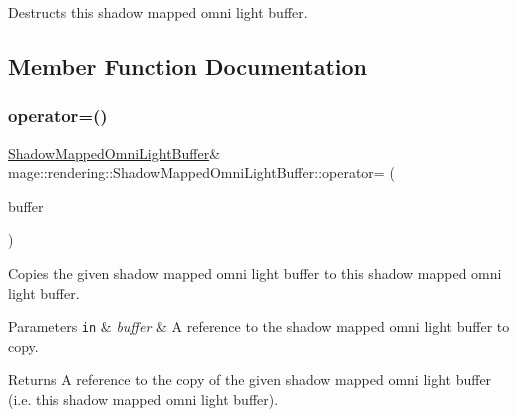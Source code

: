 Destructs this shadow mapped omni light buffer. 

\subsection{Member Function Documentation}
\hypertarget{structmage_1_1rendering_1_1_shadow_mapped_omni_light_buffer_ae43119f667592aea06f73532a9c9b742}{}\label{structmage_1_1rendering_1_1_shadow_mapped_omni_light_buffer_ae43119f667592aea06f73532a9c9b742} 
\subsubsection{\texorpdfstring{operator=()}{operator=()}\hspace{0.1cm}{\footnotesize\ttfamily [1/2]}}
{\footnotesize\ttfamily \hyperlink{structmage_1_1rendering_1_1_shadow_mapped_omni_light_buffer}{Shadow\+Mapped\+Omni\+Light\+Buffer}\& mage\+::rendering\+::\+Shadow\+Mapped\+Omni\+Light\+Buffer\+::operator= (\begin{DoxyParamCaption}\item[{const \hyperlink{structmage_1_1rendering_1_1_shadow_mapped_omni_light_buffer}{Shadow\+Mapped\+Omni\+Light\+Buffer} \&}]{buffer }\end{DoxyParamCaption})\hspace{0.3cm}{\ttfamily [default]}}

Copies the given shadow mapped omni light buffer to this shadow mapped omni light buffer.


\begin{DoxyParams}[1]{Parameters}
\mbox{\tt in}  & {\em buffer} & A reference to the shadow mapped omni light buffer to copy. \\
\hline
\end{DoxyParams}
\begin{DoxyReturn}{Returns}
A reference to the copy of the given shadow mapped omni light buffer (i.\+e. this shadow mapped omni light buffer). 
\end{DoxyReturn}
\hypertarget{structmage_1_1rendering_1_1_shadow_mapped_omni_light_buffer_a5605852385a384c28a4c0cee6bc3cc32}{}\label{structmage_1_1rendering_1_1_shadow_mapped_omni_light_buffer_a5605852385a384c28a4c0cee6bc3cc32} 
